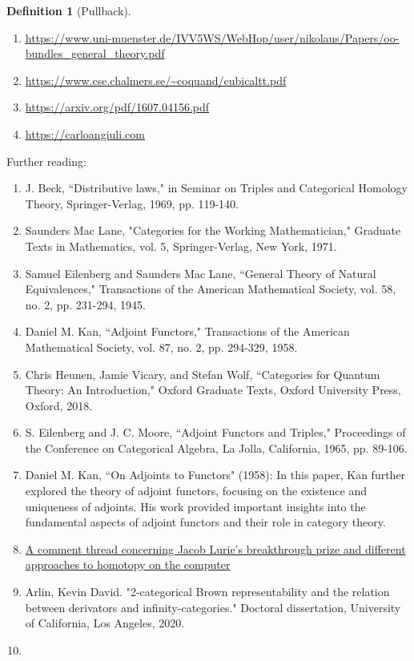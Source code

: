 \documentclass{book}
\theoremstyle{definition}
\newtheorem{definition}{Definition}
\begin{document}
\begin{definition}[Pullback]
\begin{enumerate}
\item \url{https://www.uni-muenster.de/IVV5WS/WebHop/user/nikolaus/Papers/oo-bundles_general_theory.pdf}
\item \url{https://www.cse.chalmers.se/~coquand/cubicaltt.pdf}
\item \url{https://arxiv.org/pdf/1607.04156.pdf}
\item \url{https://carloangiuli.com}
\end{enumerate}

Further reading:

\begin{enumerate}
\item J. Beck, ``Distributive laws," in Seminar on Triples and Categorical Homology Theory, Springer-Verlag, 1969, pp. 119-140.
\item Saunders Mac Lane, "Categories for the Working Mathematician," Graduate Texts in Mathematics, vol. 5, Springer-Verlag, New York, 1971.
\item Samuel Eilenberg and Saunders Mac Lane, ``General Theory of Natural Equivalences," Transactions of the American Mathematical Society, vol. 58, no. 2, pp. 231-294, 1945.
\item Daniel M. Kan, ``Adjoint Functors," Transactions of the American Mathematical Society, vol. 87, no. 2, pp. 294-329, 1958.
\item Chris Heunen, Jamie Vicary, and Stefan Wolf, ``Categories for Quantum Theory: An Introduction," Oxford Graduate Texts, Oxford University Press, Oxford, 2018.
\item S. Eilenberg and J. C. Moore, ``Adjoint Functors and Triples," Proceedings of the Conference on Categorical Algebra, La Jolla, California, 1965, pp. 89-106.
\item Daniel M. Kan, ``On Adjoints to Functors" (1958): In this paper, Kan further explored the theory of adjoint functors, focusing on the existence and uniqueness of adjoints. His work provided important insights into the fundamental aspects of adjoint functors and their role in category theory.
\item \href{https://mathematicswithoutapologies.wordpress.com/2015/05/13/univalent-foundations-no-comment/}{A comment thread concerning Jacob Lurie's breakthrough prize and different approaches to homotopy on the computer}
\item Arlin, Kevin David. "2-categorical Brown representability and the relation between derivators and infinity-categories." Doctoral dissertation, University of California, Los Angeles, 2020.
\item 
\end{enumerate}


\end{definition}
\end{document}
